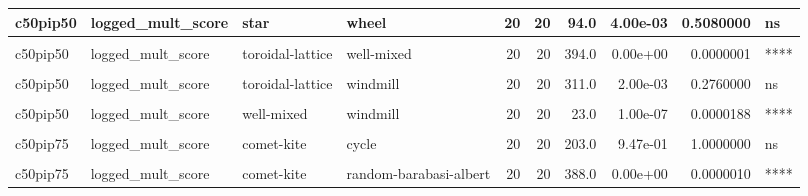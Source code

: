 \documentclass[
]{book}
\begin{document}
\begin{table}
\begin{tabular}{l|l|l|l|r|r|r|r|r|l}
\hline
c50pip50 & logged\_mult\_score & star & wheel & 20 & 20 & 94.0 & 4.00e-03 & 0.5080000 & ns\\
\hline
\cellcolor{gray!6}{c50pip50} & \cellcolor{gray!6}{logged\_mult\_score} & \cellcolor{gray!6}{star} & \cellcolor{gray!6}{windmill} & \cellcolor{gray!6}{20} & \cellcolor{gray!6}{20} & \cellcolor{gray!6}{211.0} & \cellcolor{gray!6}{7.79e-01} & \cellcolor{gray!6}{1.0000000} & \cellcolor{gray!6}{ns}\\
\hline
c50pip50 & logged\_mult\_score & toroidal-lattice & well-mixed & 20 & 20 & 394.0 & 0.00e+00 & 0.0000001 & ****\\
\hline
\cellcolor{gray!6}{c50pip50} & \cellcolor{gray!6}{logged\_mult\_score} & \cellcolor{gray!6}{toroidal-lattice} & \cellcolor{gray!6}{wheel} & \cellcolor{gray!6}{20} & \cellcolor{gray!6}{20} & \cellcolor{gray!6}{37.0} & \cellcolor{gray!6}{1.70e-06} & \cellcolor{gray!6}{0.0003317} & \cellcolor{gray!6}{***}\\
\hline
c50pip50 & logged\_mult\_score & toroidal-lattice & windmill & 20 & 20 & 311.0 & 2.00e-03 & 0.2760000 & ns\\
\hline
\cellcolor{gray!6}{c50pip50} & \cellcolor{gray!6}{logged\_mult\_score} & \cellcolor{gray!6}{well-mixed} & \cellcolor{gray!6}{wheel} & \cellcolor{gray!6}{20} & \cellcolor{gray!6}{20} & \cellcolor{gray!6}{0.0} & \cellcolor{gray!6}{0.00e+00} & \cellcolor{gray!6}{0.0000000} & \cellcolor{gray!6}{****}\\
\hline
c50pip50 & logged\_mult\_score & well-mixed & windmill & 20 & 20 & 23.0 & 1.00e-07 & 0.0000188 & ****\\
\hline
\cellcolor{gray!6}{c50pip50} & \cellcolor{gray!6}{logged\_mult\_score} & \cellcolor{gray!6}{wheel} & \cellcolor{gray!6}{windmill} & \cellcolor{gray!6}{20} & \cellcolor{gray!6}{20} & \cellcolor{gray!6}{395.0} & \cellcolor{gray!6}{0.00e+00} & \cellcolor{gray!6}{0.0000001} & \cellcolor{gray!6}{****}\\
\hline
c50pip75 & logged\_mult\_score & comet-kite & cycle & 20 & 20 & 203.0 & 9.47e-01 & 1.0000000 & ns\\
\hline
\cellcolor{gray!6}{c50pip75} & \cellcolor{gray!6}{logged\_mult\_score} & \cellcolor{gray!6}{comet-kite} & \cellcolor{gray!6}{linear-chain} & \cellcolor{gray!6}{20} & \cellcolor{gray!6}{20} & \cellcolor{gray!6}{196.0} & \cellcolor{gray!6}{9.25e-01} & \cellcolor{gray!6}{1.0000000} & \cellcolor{gray!6}{ns}\\
\hline
c50pip75 & logged\_mult\_score & comet-kite & random-barabasi-albert & 20 & 20 & 388.0 & 0.00e+00 & 0.0000010 & ****\\

\end{tabular}
\end{table}
\end{document}
